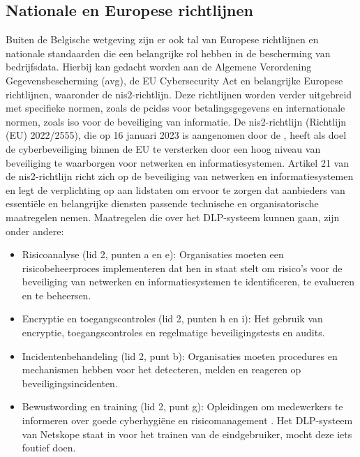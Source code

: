 \subsection{Nationale en Europese richtlijnen}%
\label{sec:nationale-europese-richtlijnen-literatuurstudie}

Buiten de Belgische wetgeving zijn er ook tal van Europese richtlijnen en nationale standaarden die een belangrijke rol hebben in de bescherming van bedrijfsdata. 
Hierbij kan gedacht worden aan de Algemene Verordening Gegevensbescherming (\gls{avg}), de EU Cybersecurity Act en belangrijke Europese richtlijnen, waaronder de \gls{nis2}-richtlijn. 
Deze richtlijnen worden verder uitgebreid met specifieke normen, zoals de \gls{pcidss} voor betalingsgegevens en internationale normen, zoals \gls{iso} voor de beveiliging van informatie. 
De \gls{nis2}-richtlijn (Richtlijn (EU) 2022/2555), die op 16 januari 2023 is aangenomen door de \textcite{nis2directive}, 
heeft als doel de cyberbeveiliging binnen de EU te versterken door een hoog niveau van beveiliging te waarborgen voor netwerken en informatiesystemen. 
Artikel 21 van de \gls{nis2}-richtlijn richt zich op de beveiliging van netwerken en informatiesystemen en legt de verplichting op aan lidstaten om 
ervoor te zorgen dat aanbieders van essentiële en belangrijke diensten passende technische en organisatorische maatregelen nemen. 
Maatregelen die over het DLP-systeem kunnen gaan, zijn onder andere: 

\begin{itemize}
    \item Risicoanalyse (lid 2, punten a en e): Organisaties moeten een risicobeheerproces implementeren dat hen in staat stelt om risico's voor de beveiliging van netwerken en informatiesystemen te identificeren, te evalueren en te beheersen.
    \item Encryptie en toegangscontroles (lid 2, punten h en i): Het gebruik van encryptie, toegangscontroles en regelmatige beveiligingstests en audits.
    \item Incidentenbehandeling (lid 2, punt b): Organisaties moeten procedures en mechanismen hebben voor het detecteren, melden en reageren op beveiligingsincidenten.
    \item Bewustwording en training (lid 2, punt g): Opleidingen om medewerkers te informeren over goede cyberhygiëne en risicomanagement \autocite{nis2directive}. Het DLP-systeem van Netskope staat in voor het trainen van de eindgebruiker, mocht deze iets foutief doen.
\end{itemize}

